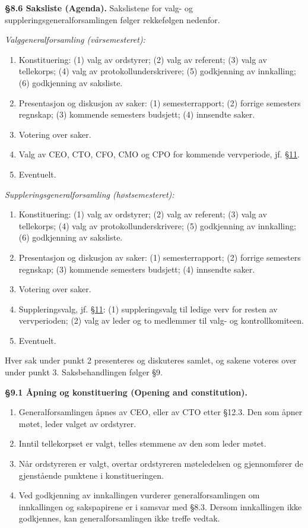 \documentclass{../../../Common/Latex/Templates/rapport}
\begin{document}
\textbf{\S 8.6 Saksliste (Agenda).}\label{bylaw:8.6} Sakslistene for valg- og suppleringsgeneralforsamlingen følger rekkefølgen nedenfor.

\emph{Valggeneralforsamling (vårsemesteret):}
\begin{enumerate}
  \item Konstituering: (1) valg av ordstyrer; (2) valg av referent; (3) valg av tellekorps; (4) valg av protokollunderskrivere; (5) godkjenning av innkalling; (6) godkjenning av saksliste.
  \item Presentasjon og diskusjon av saker: (1) semesterrapport; (2) forrige semesters regnskap; (3) kommende semesters budsjett; (4) innsendte saker.
  \item Votering over saker.
  \item Valg av CEO, CTO, CFO, CMO og CPO for kommende vervperiode, jf. \hyperref[bylaw:11]{\S 11}.
  \item Eventuelt.
\end{enumerate}

\emph{Suppleringsgeneralforsamling (høstsemesteret):}
\begin{enumerate}
  \item Konstituering: (1) valg av ordstyrer; (2) valg av referent; (3) valg av tellekorps; (4) valg av protokollunderskrivere; (5) godkjenning av innkalling; (6) godkjenning av saksliste.
  \item Presentasjon og diskusjon av saker: (1) semesterrapport; (2) forrige semesters regnskap; (3) kommende semesters budsjett; (4) innsendte saker.
  \item Votering over saker.
  \item Suppleringsvalg, jf. \hyperref[bylaw:11]{\S 11}: (1) suppleringsvalg til ledige verv for resten av vervperioden; (2) valg av leder og to medlemmer til valg- og kontrollkomiteen.
  \item Eventuelt.
\end{enumerate}

Hver sak under punkt 2 presenteres og diskuteres samlet, og sakene voteres over under punkt 3. Saksbehandlingen følger \S9.

\label{bylaw:9}
\textbf{\S 9.1 Åpning og konstituering (Opening and constitution).}\label{bylaw:9.1}
\begin{enumerate}
  \item Generalforsamlingen åpnes av CEO, eller av CTO etter \S12.3. Den som åpner møtet, leder valget av ordstyrer.
  \item Inntil tellekorpset er valgt, telles stemmene av den som leder møtet.
  \item Når ordstyreren er valgt, overtar ordstyreren møteledelsen og gjennomfører de gjenstående punktene i konstitueringen.
  \item Ved godkjenning av innkallingen vurderer generalforsamlingen om innkallingen og sakspapirene er i samsvar med \S8.3. Dersom innkallingen ikke godkjennes, kan generalforsamlingen ikke treffe vedtak.
\end{enumerate}
\end{document}
